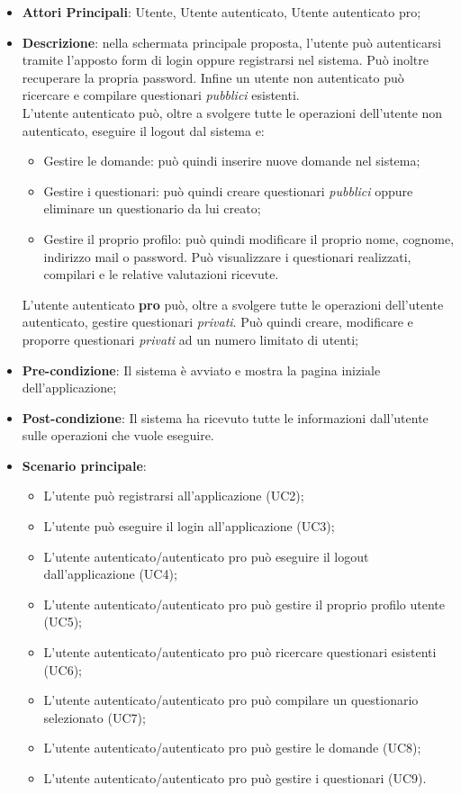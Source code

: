 \begin{itemize}
\item\textbf{Attori Principali}: Utente, Utente autenticato, Utente autenticato pro;
\item\textbf{Descrizione}: nella schermata principale proposta, l'utente può autenticarsi tramite l'apposto form di login oppure registrarsi nel sistema. Può inoltre recuperare la propria password. Infine un utente non autenticato può ricercare e compilare questionari \textit{pubblici} esistenti.\\
L'utente autenticato può, oltre a svolgere tutte le operazioni dell'utente non autenticato, eseguire il logout dal sistema e:
\begin{itemize}
\item Gestire le domande: può quindi inserire nuove domande nel sistema;
\item Gestire i questionari: può quindi creare questionari \textit{pubblici} oppure eliminare un questionario da lui creato;
\item Gestire il proprio profilo: può quindi modificare il proprio nome, cognome, indirizzo mail o password. Può visualizzare i questionari realizzati, compilari e le relative valutazioni ricevute.
\end{itemize}
L'utente autenticato \textbf{pro} può, oltre a svolgere tutte le operazioni dell'utente autenticato, gestire questionari \textit{privati}. Può quindi creare, modificare e proporre questionari \textit{privati} ad un numero limitato di utenti;
\item\textbf{Pre-condizione}: Il sistema è avviato e mostra la pagina iniziale dell'applicazione;
\item\textbf{Post-condizione}: Il sistema ha ricevuto tutte le informazioni dall'utente sulle operazioni che vuole eseguire.
\item\textbf{Scenario principale}:
\begin{itemize}
\item L'utente può registrarsi all'applicazione (UC2);
\item L'utente può eseguire il login all'applicazione (UC3);
\item L'utente autenticato/autenticato pro può eseguire il logout dall'applicazione (UC4); 
\item L'utente autenticato/autenticato pro può gestire il proprio profilo utente (UC5);
\item L'utente autenticato/autenticato pro può ricercare questionari esistenti (UC6);
\item L'utente autenticato/autenticato pro può compilare un questionario  selezionato (UC7);
\item L'utente autenticato/autenticato pro può gestire le domande (UC8);
\item L'utente autenticato/autenticato pro può gestire i questionari (UC9).
\end{itemize}
\end{itemize}